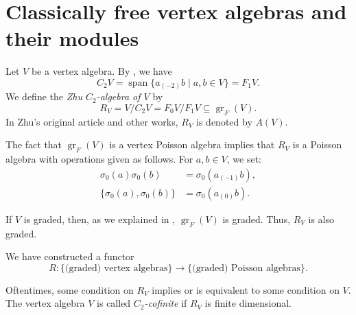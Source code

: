\documentclass[a4paper, 12pt, reqno]{amsart}
\theoremstyle{remark}
\DeclareMathOperator{\gr}{gr}
\DeclareMathOperator{\vspan}{span}
\begin{document}
\section{Classically free vertex algebras and their modules}
\label{sec:class-free-vert}

Let $V$ be a vertex algebra.
By , we have
\begin{equation*}
  C_2V = \vspan\{a_{(-2)}b \mid a, b \in V\} = F_1V.
\end{equation*}
We define the \emph{Zhu $C_2$-algebra of $V$} by
\begin{equation*}
  R_V = V/C_2V = F_0V/F_1V \subseteq \gr_F(V).
\end{equation*}
In Zhu's original article \cite{zhu_modular_1996} and other works, $R_V$ is denoted by $A(V)$.

The fact that $\gr_F(V)$ is a vertex Poisson algebra implies that $R_V$ is a Poisson algebra with operations given as follows.
For $a, b \in V$, we set:
\begin{align*}
  \sigma_0(a)\sigma_0(b) &= \sigma_0(a_{(-1)}b), \\
  \{\sigma_0(a), \sigma_0(b)\} &= \sigma_0(a_{(0)}b).
\end{align*}

If $V$ is graded, then, as we explained in , $\gr_F(V)$ is graded.
Thus, $R_V$ is also graded.

We have constructed a functor
\begin{equation*}
  R: \{\text{(graded) vertex algebras}\} \to \{\text{(graded) Poisson algebras}\}.
\end{equation*}

Oftentimes, some condition on $R_V$ implies or is equivalent to some condition on $V$.
The vertex algebra $V$ is called \emph{$C_2$-cofinite} if $R_V$ is finite dimensional.
\end{document}
